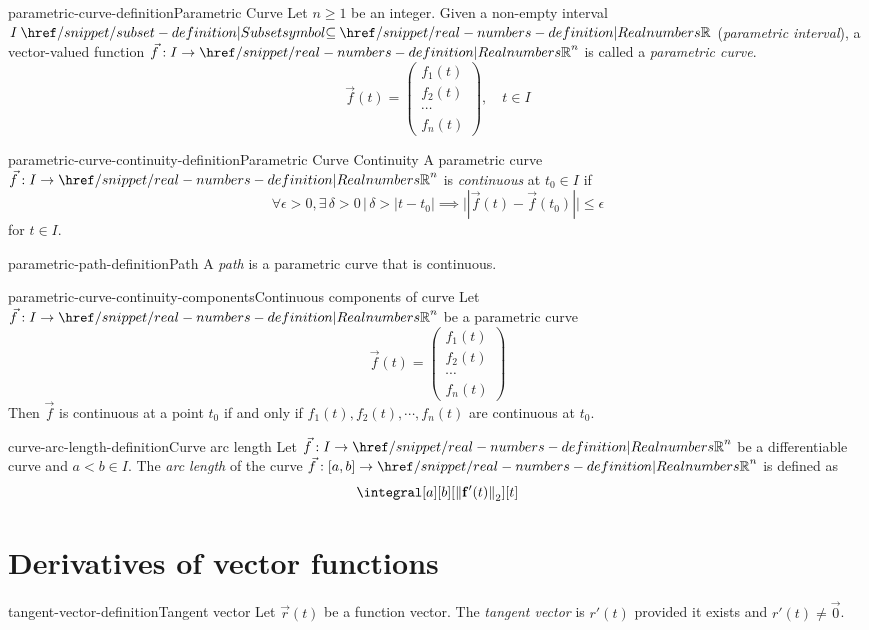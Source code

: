 \documentclass[preview]{standalone}
\begin{document}
\genpage

\begin{snippetdefinition}{parametric-curve-definition}{Parametric Curve}
    Let \(n \geq 1\) be an integer.
    Given a non-empty interval \(I \subseteq \realnumbers\)
    (\textit{parametric interval}), a vector-valued function \(\vec{f}: I\to{\realnumbers}^n\)
    is called a \textit{parametric curve}.
    \[
        \vec{f}(t) = \begin{pmatrix}
            f_1(t) \\
            f_2(t) \\
            \cdots \\
            f_n(t)
        \end{pmatrix}, \quad t \in I
    \]
\end{snippetdefinition}

\begin{snippetdefinition}{parametric-curve-continuity-definition}{Parametric Curve Continuity}
    A parametric curve \(\vec{f}: I \to {\realnumbers}^n\)
    is \textit{continuous} at \(t_0 \in I\)
    if
    \[
        \forall \epsilon > 0, 
        \exists \, \delta > 0 \,|\, \delta > |t-t_0|
        \implies ||\vec{f}(t) - \vec{f}(t_0)|| \leq \epsilon
    \]
    for \(t \in I\).
\end{snippetdefinition}

\begin{snippetdefinition}{parametric-path-definition}{Path}
    A \textit{path} is a parametric curve
    that is continuous.
\end{snippetdefinition}

\begin{snippetproposition}{parametric-curve-continuity-components}{Continuous components of curve}
    Let \(\vec{f}: I \to {\realnumbers}^n\) be a parametric curve
    \[
        \vec{f}(t) = \begin{pmatrix}
                f_1(t) \\
                f_2(t) \\
                \cdots \\
                f_n(t)
        \end{pmatrix}
    \]
    Then \(\vec{f}\) is continuous at a point \(t_0\) if and only if
    \(f_1(t), f_2(t), \cdots, f_n(t)\) are continuous at \(t_0\).
\end{snippetproposition}

\begin{snippetdefinition}{curve-arc-length-definition}{Curve arc length}
    Let \(\vec{f}:I\to{\realnumbers}^n\) be a differentiable curve
    and \(a < b \in I\).
    The \textit{arc length} of the curve \(\vec{f}:[a,b] \to {\realnumbers}^n\)
    is defined as
    \[
        \integral[a][b][\left\|\mathbf{f}^{\prime}(t)\right\|_2][t]
    \]
\end{snippetdefinition}

\section{Derivatives of vector functions}

\begin{snippetdefinition}{tangent-vector-definition}{Tangent vector}
    Let \(\vec{r}(t)\) be a function vector.
    The \textit{tangent vector} is \(r'(t)\) provided it exists and \(r'(t)\neq\vec{0}\).
\end{snippetdefinition}
\end{document}
